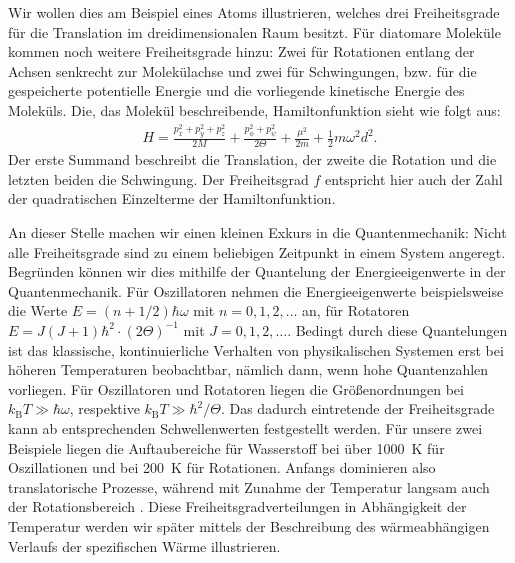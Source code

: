 Wir wollen dies am Beispiel eines Atoms illustrieren, welches drei Freiheitsgrade für die Translation im dreidimensionalen Raum besitzt. Für diatomare Moleküle kommen noch weitere Freiheitsgrade hinzu: Zwei für Rotationen entlang der Achsen senkrecht zur Molekülachse und zwei für Schwingungen, bzw. für die gespeicherte potentielle Energie und die vorliegende kinetische Energie des Moleküls.
Die, das Molekül beschreibende, Hamiltonfunktion sieht wie folgt aus:
\begin{align*}
    H=\frac{p_x^2+p_y^2+p_z^2}{2M}+\frac{p_{\phi}^2+p_{\psi}^2}{2\Theta}+\frac{\mu^2}{2m}+\frac{1}{2}m\omega^2d^2.
\end{align*}
Der erste Summand beschreibt die Translation, der zweite die Rotation und die letzten beiden die Schwingung.
Der Freiheitsgrad $f$ entspricht hier auch der Zahl der quadratischen Einzelterme der Hamiltonfunktion.

An dieser Stelle machen wir einen kleinen Exkurs in die Quantenmechanik:
Nicht alle Freiheitsgrade sind zu einem beliebigen Zeitpunkt in einem System angeregt. Begründen können wir dies mithilfe der Quantelung der Energieeigenwerte in der Quantenmechanik.
Für Oszillatoren nehmen die Energieeigenwerte beispielsweise die Werte $E=(n+1/2)\hbar\omega$ mit $n=0,1,2,\ldots$ an, für Rotatoren $E=J(J+1)\hbar^2\cdot(2\Theta)^{-1}$ mit $J=0,1,2,\ldots$.
Bedingt durch diese Quantelungen ist das klassische, kontinuierliche Verhalten von physikalischen Systemen erst bei höheren Temperaturen beobachtbar, nämlich dann, wenn hohe Quantenzahlen vorliegen. Für Oszillatoren und Rotatoren liegen die Größenordnungen bei $k_\mathrm{B}T\gg\hbar\omega $, respektive $k_\mathrm{B}T\gg\hbar^2/\Theta$.
Das dadurch eintretende  der Freiheitsgrade kann ab entsprechenden Schwellenwerten festgestellt werden. Für unsere zwei Beispiele liegen die Auftaubereiche für Wasserstoff bei über \SI{1000}{\kelvin} für Oszillationen und bei \SI{200}{\kelvin} für Rotationen.
Anfangs dominieren also translatorische Prozesse, während mit Zunahme der Temperatur langsam auch der Rotationsbereich .
Diese Freiheitsgradverteilungen in Abhängigkeit der Temperatur werden wir später mittels der Beschreibung des wärmeabhängigen Verlaufs der spezifischen Wärme illustrieren.


